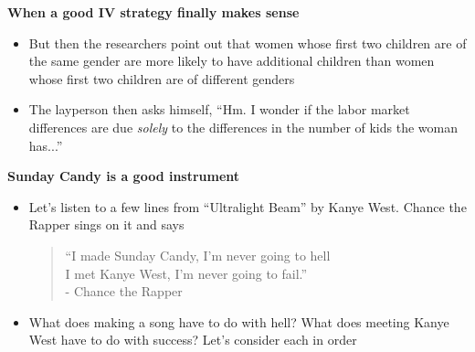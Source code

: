 \documentclass[notes=show]{beamer}
\begin{document}
\begin{frame}[plain]
\begin{center}
\textbf{When a good IV strategy finally makes sense}
\end{center}

\begin{itemize}
		\item But then the researchers point out that women whose first two children are of the same gender are more likely to have additional children than women whose first two children are of different genders
		\item The layperson then asks himself, ``Hm. I wonder if the labor market differences are due \emph{solely} to the differences in the number of kids the woman has...''

\end{itemize}

\end{frame}

\begin{frame}[plain]
\begin{center}
\textbf{Sunday Candy is a good instrument}
\end{center}

\begin{itemize}
		\item Let's listen to a few lines from ``Ultralight Beam'' by Kanye West. Chance the Rapper sings on it and says

\begin{quote}
``I made Sunday Candy, I'm never going to hell \\


I met Kanye West, I'm never going to fail.'' \\


- Chance the Rapper
\end{quote}

	\item What does making a song have to do with hell?  What does meeting Kanye West have to do with success? Let's consider each in order
	\end{itemize}
\end{frame}
\end{document}
